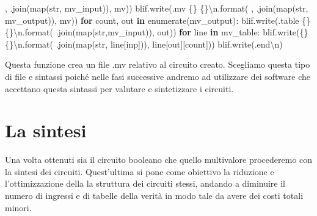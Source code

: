 \documentclass[
]{book}
\newenvironment{Shaded}{\begin{snugshade}}{\end{snugshade}}
\newcommand{\BuiltInTok}[1]{#1}
\newcommand{\CharTok}[1]{\textcolor[rgb]{0.31,0.60,0.02}{#1}}
\newcommand{\ControlFlowTok}[1]{\textcolor[rgb]{0.13,0.29,0.53}{\textbf{#1}}}
\newcommand{\KeywordTok}[1]{\textcolor[rgb]{0.13,0.29,0.53}{\textbf{#1}}}
\newcommand{\NormalTok}[1]{#1}
\newcommand{\SpecialCharTok}[1]{\textcolor[rgb]{0.00,0.00,0.00}{#1}}
\newcommand{\StringTok}[1]{\textcolor[rgb]{0.31,0.60,0.02}{#1}}
\begin{document}
\begin{Shaded}
\begin{Highlighting}[]
      \StringTok{\textquotesingle{}, \textquotesingle{}}\NormalTok{.join(}\BuiltInTok{map}\NormalTok{(}\BuiltInTok{str}\NormalTok{, mv\_input)), mv))}
\NormalTok{  blif.write(}\StringTok{\textquotesingle{}.mv }\SpecialCharTok{\{\}}\StringTok{ }\SpecialCharTok{\{\}}\CharTok{\textbackslash{}n}\StringTok{\textquotesingle{}}\NormalTok{.}\BuiltInTok{format}\NormalTok{(}
      \StringTok{\textquotesingle{}, \textquotesingle{}}\NormalTok{.join(}\BuiltInTok{map}\NormalTok{(}\BuiltInTok{str}\NormalTok{, mv\_output)), mv))}
  \ControlFlowTok{for}\NormalTok{ count, out }\KeywordTok{in} \BuiltInTok{enumerate}\NormalTok{(mv\_output):}
\NormalTok{      blif.write(}\StringTok{\textquotesingle{}.table }\SpecialCharTok{\{\}}\StringTok{ }\SpecialCharTok{\{\}}\CharTok{\textbackslash{}n}\StringTok{\textquotesingle{}}\NormalTok{.}\BuiltInTok{format}\NormalTok{(}\StringTok{\textquotesingle{} \textquotesingle{}}\NormalTok{.join(}\BuiltInTok{map}\NormalTok{(}\BuiltInTok{str}\NormalTok{,mv\_input)), out))}
    \ControlFlowTok{for}\NormalTok{ line }\KeywordTok{in}\NormalTok{ mv\_table:}
\NormalTok{      blif.write(}\StringTok{\textquotesingle{}}\SpecialCharTok{\{\}}\StringTok{ }\SpecialCharTok{\{\}}\CharTok{\textbackslash{}n}\StringTok{\textquotesingle{}}\NormalTok{.}\BuiltInTok{format}\NormalTok{(}
        \StringTok{\textquotesingle{} \textquotesingle{}}\NormalTok{.join(}\BuiltInTok{map}\NormalTok{(}\BuiltInTok{str}\NormalTok{, line[}\StringTok{\textquotesingle{}inp\textquotesingle{}}\NormalTok{])), line[}\StringTok{\textquotesingle{}out\textquotesingle{}}\NormalTok{][count]))}
\NormalTok{  blif.write(}\StringTok{\textquotesingle{}.end}\CharTok{\textbackslash{}n}\StringTok{\textquotesingle{}}\NormalTok{)}
\end{Highlighting}
\end{Shaded}

Questa funzione crea un file .mv relativo al circuito creato. Scegliamo questa tipo di file e sintassi poiché nelle fasi successive andremo ad utilizzare dei software che accettano questa sintassi per valutare e sintetizzare i circuiti.

\newpage

\hypertarget{la-sintesi}{%
\section{La sintesi}\label{la-sintesi}}

Una volta ottenuti sia il circuito booleano che quello multivalore procederemo con la sintesi dei circuiti. Quest'ultima si pone come obiettivo la riduzione e l'ottimizzazione della la struttura dei circuiti stessi, andando a diminuire il numero di ingressi e di tabelle della verità in modo tale da avere dei costi totali minori.
\end{document}
